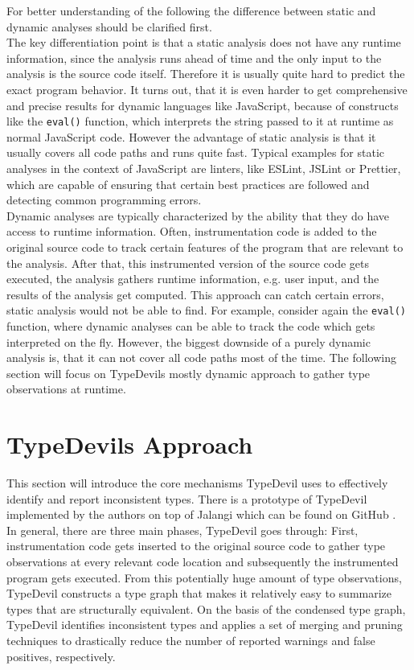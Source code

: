 \documentclass[runningheads,a4paper]{llncs}
\begin{document}
For better understanding of the following the difference between static and dynamic analyses should be clarified first.\\
The key differentiation point is that a static analysis does not have any runtime information, since the analysis runs ahead of time and the only input to the analysis is the source code itself.
Therefore it is usually quite hard to predict the exact program behavior.
It turns out, that it is even harder to get comprehensive and precise results for dynamic languages like JavaScript, because of constructs like the \lstinline[columns=fixed]{eval()} function, which interprets the string passed to it at runtime as normal JavaScript code. 
However the advantage of static analysis is that it usually covers all code paths and runs quite fast.
Typical examples for static analyses in the context of JavaScript are linters, like ESLint, JSLint or Prettier, which are capable of ensuring that certain best practices are followed and detecting common programming errors. \\
Dynamic analyses are typically characterized by the ability that they do have access to runtime information.
Often, instrumentation code is added to the original source code to track certain features of the program that are relevant to the analysis.
After that, this instrumented version of the source code gets executed, the analysis gathers runtime information, e.g. user input, and the results of the analysis get computed.
This approach can catch certain errors, static analysis would not be able to find.
For example, consider again the \lstinline[columns=fixed]{eval()} function, where dynamic analyses can be able to track the code which gets interpreted on the fly.
However, the biggest downside of a purely dynamic analysis is, that it can not cover all code paths most of the time.
The following section will focus on TypeDevils mostly dynamic approach to gather type observations at runtime.

\section{TypeDevils Approach}

This section will introduce the core mechanisms TypeDevil uses to effectively identify and report inconsistent types.
There is a prototype of TypeDevil implemented by the authors on top of Jalangi \cite{DBLP:conf/sigsoft/SenKBG13a} which can be found on GitHub \cite{TypeDevilGitHub}.\\
In general, there are three main phases, TypeDevil goes through: 
First, instrumentation code gets inserted to the original source code to gather type observations at every relevant code location and subsequently the instrumented program gets executed.
From this potentially huge amount of type observations, TypeDevil constructs a type graph that makes it relatively easy to summarize types that are structurally equivalent.
On the basis of the condensed type graph, TypeDevil identifies inconsistent types and applies a set of merging and pruning techniques to drastically reduce the number of reported warnings and false positives, respectively.
\end{document}
